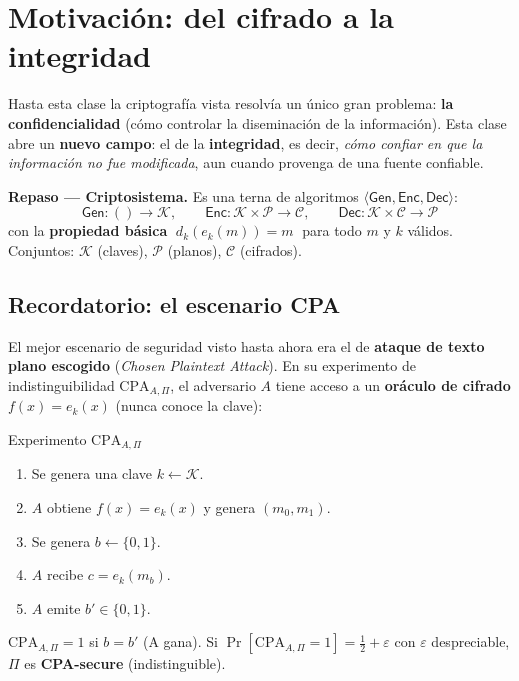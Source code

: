 \documentclass[11pt,a4paper]{article}
\newcommand{\Kset}{\mathcal{K}}
\newcommand{\Pset}{\mathcal{P}}
\newcommand{\Cset}{\mathcal{C}}
\newcommand{\Gen}{\mathsf{Gen}}
\newcommand{\Enc}{\mathsf{Enc}}
\newcommand{\Dec}{\mathsf{Dec}}
\begin{document}
\tableofcontents
\newpage

\section{Motivación: del cifrado a la integridad}

Hasta esta clase la criptografía vista resolvía un único gran problema:
\textbf{la confidencialidad} (cómo controlar la diseminación de la información). Esta clase
abre un \textbf{nuevo campo}: el de la \textbf{integridad}, es decir, \emph{cómo confiar en
que la información no fue modificada}, aun cuando provenga de una fuente confiable.

\begin{slidebox}
\textbf{Repaso — Criptosistema.} Es una terna de algoritmos
$\langle \Gen, \Enc, \Dec\rangle$:
\[
  \Gen:()\to\Kset,\qquad \Enc:\Kset\times\Pset\to\Cset,\qquad \Dec:\Kset\times\Cset\to\Pset
\]
con la \textbf{propiedad básica} $\;d_k(e_k(m))=m\;$ para todo $m$ y $k$ válidos.
Conjuntos: $\Kset$ (claves), $\Pset$ (planos), $\Cset$ (cifrados).
\end{slidebox}

\subsection{Recordatorio: el escenario CPA}
El mejor escenario de seguridad visto hasta ahora era el de \textbf{ataque de texto plano
escogido} (\emph{Chosen Plaintext Attack}). En su experimento de indistinguibilidad
$\mathrm{CPA}_{A,\Pi}$, el adversario $A$ tiene acceso a un \textbf{oráculo de cifrado}
$f(x)=e_k(x)$ (nunca conoce la clave):

\begin{defbox}{Experimento $\mathrm{CPA}_{A,\Pi}$}
\begin{enumerate}[leftmargin=1.6em,itemsep=1pt]
  \item Se genera una clave $k\leftarrow \Kset$.
  \item $A$ obtiene $f(x)=e_k(x)$ y genera $(m_0,m_1)$.
  \item Se genera $b\leftarrow\{0,1\}$.
  \item $A$ recibe $c=e_k(m_b)$.
  \item $A$ emite $b'\in\{0,1\}$.
\end{enumerate}
$\mathrm{CPA}_{A,\Pi}=1$ si $b=b'$ (A gana). Si $\Pr[\mathrm{CPA}_{A,\Pi}=1]=\tfrac12+\varepsilon$
con $\varepsilon$ despreciable, $\Pi$ es \textbf{CPA-secure} (indistinguible).
\end{defbox}
\end{document}
